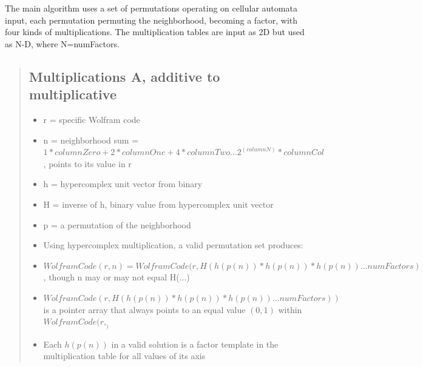 \documentclass[11pt]{article}
\begin{document}
The main algorithm uses a set of permutations operating on cellular automata input, each permutation permuting the neighborhood, becoming a factor, with four kinds of multiplications. The multiplication tables are input as 2D but used as N-D, where N=numFactors.
\begin{quote}
\subsection{Multiplications A, additive to multiplicative}
\begin{itemize}
\item r = specific Wolfram code
\item n = neighborhood sum = $1*columnZero + 2*columnOne+ 4*columnTwo...2^(columnN)*columnCol$, points to its value in r
\item h = hypercomplex unit vector from binary
\item H = inverse of h, binary value from hypercomplex unit vector
\item p = a permutation of the neighborhood
\item Using hypercomplex multiplication, a valid permutation set produces:
\item $WolframCode(r, n) = WolframCode(r,  H(h(p(n)) * h(p(n)) * h(p(n)) ... numFactors)$, though n may or may not equal H(...)
\item $WolframCode(r, H(h(p(n)) * h(p(n)) * h(p(n)) ... numFactors))$ is a pointer array that always points to an equal value $(0,1)$ within $WolframCode(r, _)$
\item Each $h(p(n))$ in a valid solution is a factor template in the multiplication table for all values of its axis
\end{itemize}
\end{quote}
\end{document}
